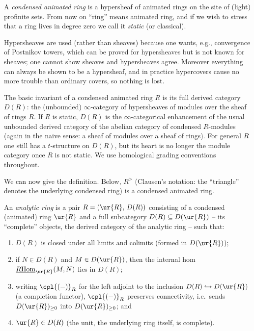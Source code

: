 \begin{definition}
\label{def:1:condensed-animated-ring}
A \emph{condensed animated ring} is a hypersheaf of animated rings on the site of
(light) profinite sets. From now on ``ring'' means animated ring, and if we wish
to stress that a ring lives in degree zero we call it \emph{static} (or
classical).
\end{definition}

\begin{remark}
\label{rmk:1:hypersheaves}
Hypersheaves are used (rather than sheaves) because one wants, e.g., convergence
of Postnikov towers, which can be proved for hypersheaves but is not known for
sheaves; one cannot show sheaves and hypersheaves agree. Moreover everything can
always be shown to be a hypersheaf, and in practice hypercovers cause no more
trouble than ordinary covers, so nothing is lost.
\end{remark}

\begin{definition}
\label{def:1:derived-category}
The basic invariant of a condensed animated ring $R$ is its full derived category
$D(R)$: the (unbounded) $\infty$-category of hypersheaves of modules over the
sheaf of rings $R$. If $R$ is static, $D(R)$ is the $\infty$-categorical
enhancement of the usual unbounded derived category of the abelian category of
condensed $R$-modules (again in the naive sense: a sheaf of modules over a sheaf
of rings). For general $R$ one still has a $t$-structure on $D(R)$, but its heart
is no longer the module category once $R$ is not static. We use homological
grading conventions throughout.
\end{definition}

We can now give the definition. Below, $R^{\triangleright}$ (Clausen's notation:
the ``triangle'' denotes the underlying condensed ring) is a condensed animated
ring.

\begin{definition}
\label{def:1:analytic-ring}
An \emph{analytic ring} is a pair $R=(\ur{R},\,D(R))$ consisting of a condensed
(animated) ring $\ur{R}$ and a full subcategory $D(R)\subseteq D(\ur{R})$ --
its ``complete'' objects, the derived category of the analytic ring -- such
that:
\begin{enumerate}
\item $D(R)$ is closed under all limits and colimits (formed in $D(\ur{R})$);
\item if $N\in D(R)$ and $M\in D(\ur{R})$, then the internal hom
$\underline{R\mathrm{Hom}}_{\ur{R}}(M,N)$ lies in $D(R)$;
\item writing $\cpl{(-)}_R$ for the left adjoint to the inclusion
$D(R)\hookrightarrow D(\ur{R})$ (a completion functor), $\cpl{(-)}_R$ preserves
connectivity, i.e.\ sends $D(\ur{R})_{\geq 0}$ into $D(\ur{R})_{\geq 0}$; and
\item $\ur{R}\in D(R)$ (the unit, the underlying ring itself, is complete).
\end{enumerate}
\end{definition}

